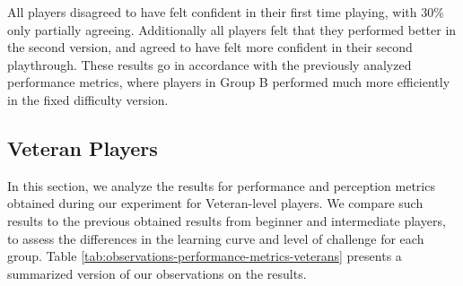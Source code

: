 All players disagreed to have felt confident in their first time playing, with 30\% only partially agreeing. Additionally all players felt that they performed better in the second version, and agreed to have felt more confident in their second playthrough. These results go in accordance with the previously analyzed performance metrics, where players in Group B performed much more efficiently in the fixed difficulty version.


\subsection{Veteran Players}

In this section, we analyze the results for performance and perception metrics obtained during our experiment for Veteran-level players. We compare such results to the previous obtained results from beginner and intermediate players, to assess the differences in the learning curve and level of challenge for each group. Table \ref{tab:observations-performance-metrics-veterans} presents a summarized version of our observations on the results.



